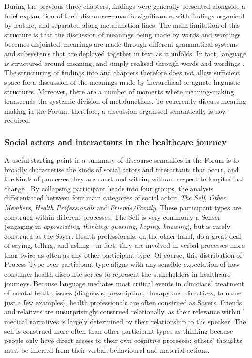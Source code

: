 During the previous three chapters,  findings were generally presented alongside a brief explanation of their \gls{discourse-semantic} significance, with findings organised by  feature, and separated along metafunction lines. The main limitation of this structure is that the discussion of meanings being made by words and wordings becomes disjointed: meanings are made through different grammatical systems and subsystems that are deployed together in text as it unfolds. In fact, language is structured around meaning, and simply realised through words and wordings \cite{halliday1978language}. The structuring of findings into  and  chapters therefore does not allow sufficient space for a discussion of the meanings made by hierarchical or agnate linguistic structures. Moreover, there are a number of moments where meaning\hyp{}making transcends the systemic division of metafunctions. To coherently discuss meaning\hyp{}making in the \gls{Forum}, therefore, a discussion organised semantically is now required.

\subsubsection{Social actors and interactants in the healthcare journey}

A useful starting point in a summary of \glspl{discourse-semantic} in the \gls{Forum} is to broadly characterise the kinds of social actors and interactants that occur, and the kinds of processes they are construed within, without respect to longitudinal change \cite{van_leeuwen_representation_1996}. By collapsing participant heads into four groups, the  analysis differentiated between four main categories of social actor: \emph{The Self}, \emph{Other Members}, \emph{Health Professionals} and \emph{Friends\slash Family}. These participant types are construed within different processes: The Self is very commonly a Senser (engaging in \emph{appreciating}, \emph{thinking}, \emph{guessing}, \emph{hoping}, \emph{knowing}), but is rarely construed as the Sayer. Health professionals, on the other hand, do a great deal of saying, telling, and asking---in fact, they are involved in verbal processes more than twice as often as any other participant type. Of course, this distribution of Process Type over participant type aligns with any sensible expectation of how \gls{consumer} health discourse serves to represent the stakeholders in healthcare journeys. Because language mediates most critical events in clinicians' treatment of mental health issues (diagnosis, prescription, therapy and directives, to name just a few examples), health professionals are often construed as Sayers. Friends and relatives are unsurprisingly construed relationally, as their relevance within ' medical narratives is largely determined by their relationship to the speaker. The self is construed more often than other participant types as thinking because people only have direct access to their own cognitive processes; others' thoughts must be inferred from their verbal, behavioural and material actions.

